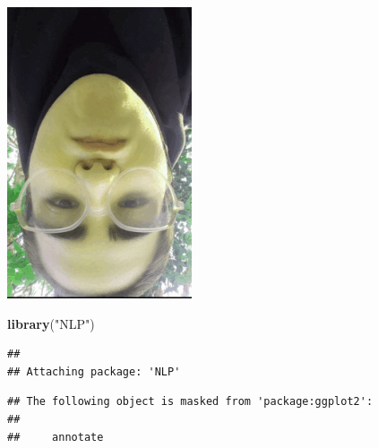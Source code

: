 \documentclass[
]{article}
\newenvironment{Shaded}{\begin{snugshade}}{\end{snugshade}}
\newcommand{\FunctionTok}[1]{\textcolor[rgb]{0.13,0.29,0.53}{\textbf{#1}}}
\newcommand{\NormalTok}[1]{#1}
\newcommand{\StringTok}[1]{\textcolor[rgb]{0.31,0.60,0.02}{#1}}
\begin{document}
\includegraphics{rgb_animation.gif}

\begin{Shaded}
\begin{Highlighting}[]
\FunctionTok{library}\NormalTok{(}\StringTok{"NLP"}\NormalTok{)}
\end{Highlighting}
\end{Shaded}

\begin{verbatim}
## 
## Attaching package: 'NLP'
\end{verbatim}

\begin{verbatim}
## The following object is masked from 'package:ggplot2':
## 
##     annotate
\end{verbatim}
\end{document}
